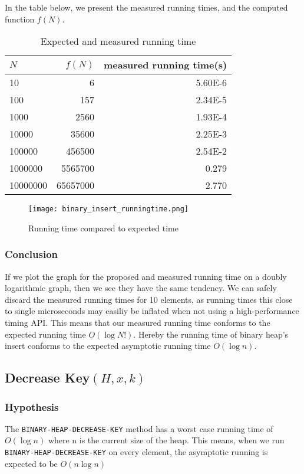 \documentclass[a4paper,oneside,11pt]{article}
\begin{document}
In the table below, we present the measured running times, and the computed function $f(N)$.
\begin{table}
  \begin{center}
    \begin{tabular}{l|r|r}
      $N$ & $f(N)$ & measured running time(s)\\
      \hline
      10       & 6         & \num{5.60E-6}\\
      100      & 157       & \num{2.34E-5}\\
      1000     & 2560      & \num{1.93E-4}\\
      10000    & 35600     & \num{2.25E-3}\\
      100000   & 456500    & \num{2.54E-2}\\
      1000000  & 5565700   & \num{0.279}\\
      10000000 & 65657000  & \num{2.770}
    \end{tabular}
    \caption{Expected and measured running time}
  \end{center}
\end{table}
\begin{figure}
  \texttt{[image: binary\_insert\_runningtime.png]}
  \caption{Running time compared to expected time}
\end{figure}

\subsubsection*{Conclusion}
If we plot the graph for the proposed and measured running time on a doubly logarithmic graph, then we see they have the same tendency. We can safely discard the measured running times for 10 elements, as running times this close to single microseconds may easiliy be inflated when not using a high-performance timing API.
This means that our measured running time conforms to the expected running time $O(\log N!)$. Hereby the running time of binary heap's insert conforms to the expected asymptotic running time $O(\log n)$.

\subsection*{Decrease Key$(H,x,k)$}

\subsubsection*{Hypothesis}
The \texttt{BINARY-HEAP-DECREASE-KEY} method has a worst case running time of $O(\log n)$ where n is the current size of the heap. This means, when we run \texttt{BINARY-HEAP-DECREASE-KEY} on every element, the asymptotic running is expected to be $O(n\log n)$ 
\end{document}
